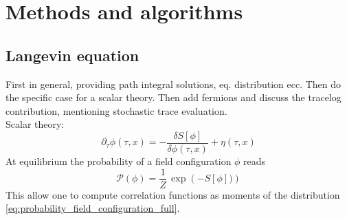 \chapter{Methods and algorithms}
\section{Langevin equation}
First in general, providing path integral solutions, eq. distribution ecc. Then do the specific case for a scalar theory. Then add fermions and discuss the tracelog contribution, mentioning stochastic trace evaluation. \\
Scalar theory:
\begin{equation}
    \partial_\tau \phi(\tau, x) = - \frac{\delta S[\phi]}{\delta \phi (\tau, x)} + \eta (\tau, x)
    \label{eq:Langevin_scalar_full}
\end{equation}
At equilibrium the probability of a field configuration $\phi$ reads
\begin{equation}
    \mathcal{P}(\phi) = \frac{1}{Z} \, \exp\left(-S[\phi])\right)
    \label{eq:probability_field_configuration_full}
\end{equation}
This allow one to compute correlation functions as moments of the distribution \eqref{eq:probability_field_configuration_full}.



